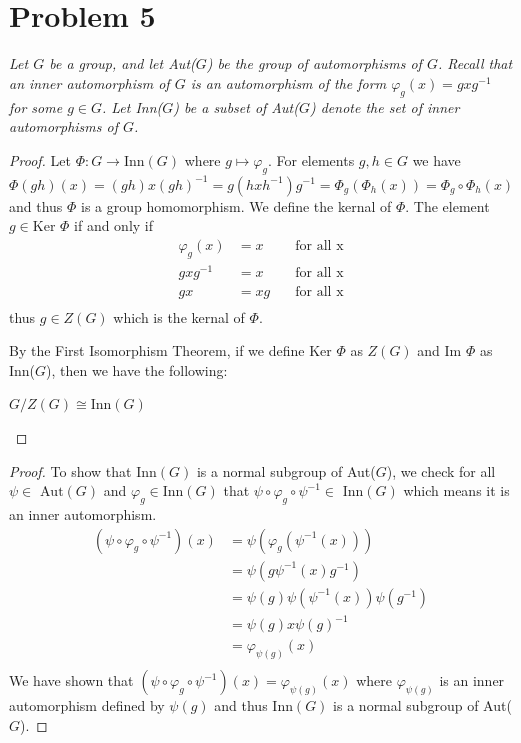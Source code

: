 \documentclass{article}
\theoremstyle{plain} %
\theoremstyle{definition} %
\begin{document}
\section*{Problem 5}
\noindent\textit{Let $G$ be a group, and let Aut($G$) be the group of automorphisms of $G$. Recall that
an inner automorphism of $G$ is an automorphism of the form $\varphi_g(x) = gxg^{-1}$ for some
$g \in G$. Let Inn($G$) be a subset of Aut($G$) denote the set of inner automorphisms of $G$.}

\noindent{}
\begin{proof}
    Let $\Phi : G \to \text{Inn}(G)$ where $g \mapsto \varphi_g$. For elements $g, h \in G$ we have
    $\Phi(gh)(x) = (gh)x(gh)^{-1} = g(hxh^{-1})g^{-1} = \Phi_g(\Phi_h(x)) = \Phi_g \circ \Phi_h(x)$
    and thus $\Phi$ is a group homomorphism.
    We define the kernal of $\Phi$. The element $g \in \text{Ker }\Phi$ if and only if 
    \begin{align*}
        \varphi_g(x) &= x &\quad \text{for all x} \\
        gxg^{-1} &= x &\quad \text{for all x} \\
        gx &= xg &\quad \text{for all x} \\
    \end{align*}
    thus $g \in Z(G)$ which is the kernal of $\Phi$.

    By the First Isomorphism Theorem, if we define Ker $\Phi$ as $Z(G)$ and Im $\Phi$ as
    Inn($G$), then we have the following:
    \begin{centering}
        $G/Z(G) \cong \text{Inn}(G)$
    \end{centering}
\end{proof}

\noindent{}

\begin{proof}
    To show that Inn$(G)$ is a normal subgroup of Aut($G$), we check for all 
    $\psi \in \text{ Aut}(G)$ and $\varphi_g \in \text{Inn}(G)$ that $\psi \circ \varphi_g \circ \psi^{-1} \in \text{ Inn}(G)$
    which means it is an inner automorphism.
    \begin{align*}
        (\psi \circ \varphi_g \circ \psi^{-1})(x) &= \psi(\varphi_g(\psi^{-1}(x))) \\
        &= \psi(g\psi^{-1}(x)g^{-1}) \\
        &= \psi(g)\psi(\psi^{-1}(x))\psi(g^{-1}) \\
        &= \psi(g)x\psi(g)^{-1} \\
        &= \varphi_{\psi(g)}(x) \\
    \end{align*}
    We have shown that $(\psi \circ \varphi_g \circ \psi^{-1})(x) = \varphi_{\psi(g)}(x)$
    where $\varphi_{\psi(g)}$ is an inner automorphism defined by $\psi(g)$ and thus
    Inn$(G)$ is a normal subgroup of Aut($G$).
    
\end{proof}
\end{document}
